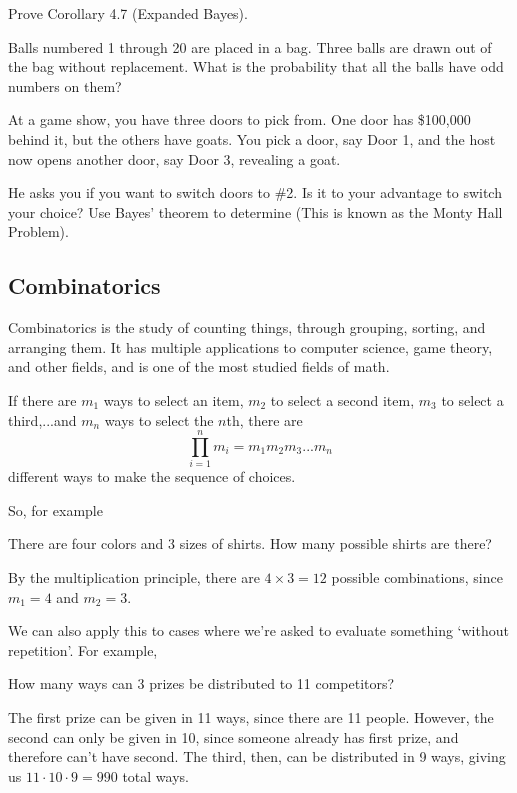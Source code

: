 \documentclass[11pt]{article}
\newcommand{\important}{$\blacktriangleright\,$}
\begin{document}
\begin{problem}[15]
    Prove Corollary 4.7 (Expanded Bayes).
\end{problem}
\begin{problem}[20]
    Balls numbered 1 through 20 are placed in a bag. Three balls are drawn out of the bag without replacement. What is the probability that all the balls have odd numbers on them?
\end{problem}
\begin{problem}[\important 35]
    At a game show, you have three doors to pick from. One door has \$100,000 behind it, but the others have goats. You pick a door, say Door 1, and the host now opens another door, say Door 3, revealing a goat.
    
    He asks you if you want to switch doors to \#2. Is it to your advantage to switch your choice? Use Bayes' theorem to determine (This is known as the Monty Hall Problem).
\end{problem}

\subsection{Combinatorics}
Combinatorics is the study of counting things, through grouping, sorting, and arranging them. It has multiple applications to computer science, game theory, and other fields, and is one of the most studied fields of math.

\begin{thrm}
    If there are $m_1$ ways to select an item, $m_2$ to select a second item, $m_3$ to select a third,...and $m_n$ ways to select the $n$th, there are
    \[\prod_{i=1}^n m_i = m_1m_2m_3...m_n\]
    different ways to make the sequence of choices.
\end{thrm}
So, for example
\begin{example}
    There are four colors and 3 sizes of shirts. How many possible shirts are there?
\end{example}
\begin{solution}
    By the multiplication principle, there are $4 \times 3 = \boxed{12}$ possible combinations, since $m_1 = 4$ and $m_2 = 3$.
\end{solution}

\noindent We can also apply this to cases where we're asked to evaluate something `without repetition'. For example,
\begin{example}
    How many ways can 3 prizes be distributed to 11 competitors?
\end{example}
\begin{solution}
    The first prize can be given in 11 ways, since there are 11 people. However, the second can only be given in 10, since someone already has first prize, and therefore can't have second. The third, then, can be distributed in 9 ways, giving us $11 \cdot 10 \cdot 9 = \boxed{990}$ total ways.
\end{solution}
\end{document}
